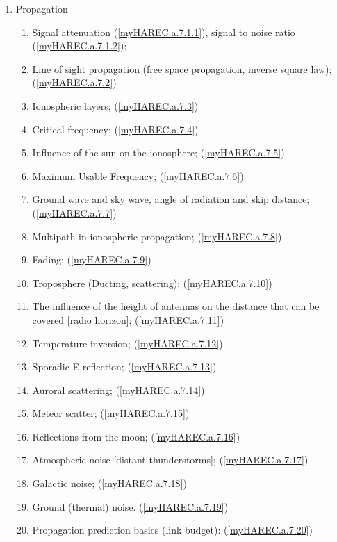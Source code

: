 \begin{enumerate}
\item Propagation
\begin{enumerate}
\item Signal attenuation (\ref{myHAREC.a.7.1.1})\label{HAREC.a.7.1.1},
  signal to noise ratio (\ref{myHAREC.a.7.1.2})\label{HAREC.a.7.1.2};
\item Line of sight propagation (free space propagation, inverse square law);
  (\ref{myHAREC.a.7.2})\label{HAREC.a.7.2}
\item Ionospheric layers; (\ref{myHAREC.a.7.3})\label{HAREC.a.7.3}
\item Critical frequency; (\ref{myHAREC.a.7.4})\label{HAREC.a.7.4}
\item Influence of the sun on the ionosphere;
  (\ref{myHAREC.a.7.5})\label{HAREC.a.7.5}
\item Maximum Usable Frequency; (\ref{myHAREC.a.7.6})\label{HAREC.a.7.6}
\item Ground wave and sky wave, angle of radiation and skip distance;
  (\ref{myHAREC.a.7.7})\label{HAREC.a.7.7}
\item Multipath in ionospheric propagation;
  (\ref{myHAREC.a.7.8})\label{HAREC.a.7.8}
\item Fading; (\ref{myHAREC.a.7.9})\label{HAREC.a.7.9}
\item Troposphere (Ducting, scattering);
  (\ref{myHAREC.a.7.10})\label{HAREC.a.7.10}
\item The influence of the height of antennas on the distance that can be
  covered [radio horizon]; (\ref{myHAREC.a.7.11})\label{HAREC.a.7.11}
\item Temperature inversion; (\ref{myHAREC.a.7.12})\label{HAREC.a.7.12}
\item Sporadic E-reflection; (\ref{myHAREC.a.7.13})\label{HAREC.a.7.13}
\item Auroral scattering; (\ref{myHAREC.a.7.14})\label{HAREC.a.7.14}
\item Meteor scatter; (\ref{myHAREC.a.7.15})\label{HAREC.a.7.15}
\item Reflections from the moon; (\ref{myHAREC.a.7.16})\label{HAREC.a.7.16}
\item Atmospheric noise [distant thunderstorms];
  (\ref{myHAREC.a.7.17})\label{HAREC.a.7.17}
\item Galactic noise; (\ref{myHAREC.a.7.18})\label{HAREC.a.7.18}
\item Ground (thermal) noise. (\ref{myHAREC.a.7.19})\label{HAREC.a.7.19}
\item Propagation prediction basics (link budget):
  (\ref{myHAREC.a.7.20})\label{HAREC.a.7.20}

\end{enumerate}
\end{enumerate}
